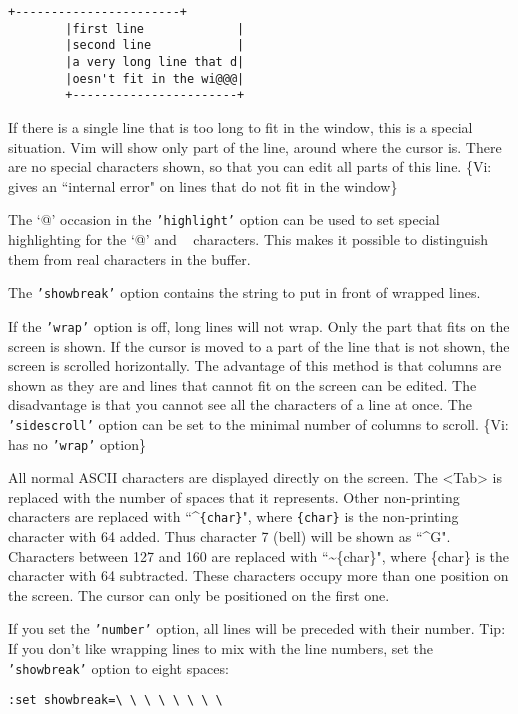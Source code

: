 \begin{Verbatim}[samepage=true]
		+-----------------------+
		|first line             |
		|second line            |
		|a very long line that d|
		|oesn't fit in the wi@@@|
		+-----------------------+
\end{Verbatim}

If there is a single line that is too long to fit in the window, this is a special situation.
Vim will show only part of the line, around where the cursor is.
There are no special characters shown, so that you can edit all parts of this line.
\{Vi: gives an ``internal error" on lines that do not fit in the window\}

The `@' occasion in the \texttt{'highlight'} option can be used to set special highlighting for the `@' and \texttt{~} characters.
This makes it possible to distinguish them from real characters in the buffer.

The \texttt{'showbreak'} option contains the string to put in front of wrapped lines.

\label{wrap-off}
If the \texttt{'wrap'} option is off, long lines will not wrap.
Only the part that fits on the screen is shown.
If the cursor is moved to a part of the line that is not shown, the screen is scrolled horizontally.
The advantage of this method is that columns are shown as they are and lines that cannot fit on the screen can be edited.
The disadvantage is that you cannot see all the characters of a line at once.
The \texttt{'sidescroll'} option can be set to the minimal number of columns to scroll.
\{Vi: has no \texttt{'wrap'} option\}

All normal ASCII characters are displayed directly on the screen.
The <Tab> is replaced with the number of spaces that it represents.
Other non-printing characters are replaced with ``\textasciicircum \texttt{\{char\}}", where \texttt{\{char\}} is the non-printing character with 64 added.
Thus character 7 (bell) will be shown as ``\textasciicircum G".
Characters between 127 and 160 are replaced with ``\textasciitilde \{char\}", where \{char\} is the character with 64 subtracted.
These characters occupy more than one position on the screen.
The cursor can only be positioned on the first one.

 If you set the \texttt{'number'} option, all lines will be preceded with their
 number.  Tip: If you don't like wrapping lines to mix with the line numbers,
 set the \texttt{'showbreak'} option to eight spaces:
\begin{Verbatim}[samepage=true]
		:set showbreak=\ \ \ \ \ \ \ \
\end{Verbatim}

